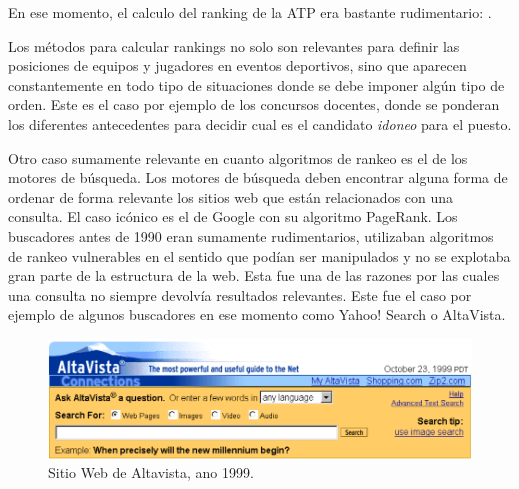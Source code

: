 En ese momento, el calculo del ranking de la ATP era bastante rudimentario:  \cite{nyt}.

Los métodos para calcular rankings no solo son relevantes para definir las posiciones de equipos y jugadores en eventos deportivos, sino que aparecen constantemente en todo tipo de situaciones donde se debe imponer algún tipo de orden. Este es el caso por ejemplo de los concursos docentes, donde se ponderan los diferentes antecedentes para decidir cual es el candidato \textit{idoneo} para el puesto.

Otro caso sumamente relevante en cuanto algoritmos de rankeo es el de los motores de búsqueda. Los motores de búsqueda deben encontrar alguna forma de ordenar de forma relevante los sitios web que están relacionados con una consulta. El caso icónico es el de Google con su algoritmo PageRank. Los buscadores antes de 1990 eran sumamente rudimentarios, utilizaban algoritmos de rankeo vulnerables en el sentido que podían ser manipulados y no se explotaba gran parte de la estructura de la web. Esta fue una de las razones por las cuales una consulta no siempre devolvía resultados relevantes. Este fue el caso por ejemplo de algunos buscadores en ese momento como Yahoo! Search o AltaVista.

\begin{figure}[H]
  \centering
  \includegraphics[scale=0.4]{images/altavista}
  \caption{Sitio Web de Altavista, ano 1999.}
\end{figure}

